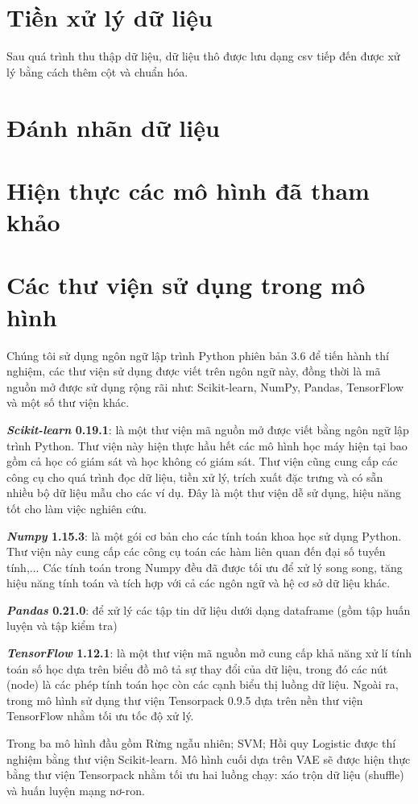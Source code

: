 \section{Tiền xử lý dữ liệu}
Sau quá trình thu thập dữ liệu, dữ liệu thô được lưu dạng csv tiếp đến được xử lý bằng cách thêm cột và chuẩn hóa.

\section{Đánh nhãn dữ liệu}

\section{Hiện thực các mô hình đã tham khảo}

\section{Các thư viện sử dụng trong mô hình}
Chúng tôi sử dụng ngôn ngữ lập trình Python phiên bản 3.6 để tiến hành thí nghiệm, các thư viện sử dụng được viết trên ngôn ngữ này, đồng thời là mã nguồn mở được sử dụng rộng rãi như: Scikit-learn, NumPy, Pandas, TensorFlow và một số thư viện khác.

\textbf{\textit{Scikit-learn} 0.19.1}: là một thư viện mã nguồn mở được viết bằng ngôn ngữ lập trình Python. Thư viện này hiện thực hầu hết các mô hình học máy hiện tại bao gồm cả học có giám sát và học
không có giám sát. Thư viện cũng cung cấp các công cụ cho quá trình đọc dữ liệu, tiền xử lý,
trích xuất đặc trưng và có sẵn nhiều bộ dữ liệu mẫu cho các ví dụ. Đây là một thư viện dễ sử
dụng, hiệu năng tốt cho làm việc nghiên cứu.

\textbf{\textit{Numpy} 1.15.3}: là một gói cơ bản cho các tính toán khoa học sử dụng Python. Thư viện này cung cấp các công cụ toán các hàm liên quan đến đại số tuyến tính,... Các tính
toán trong Numpy đều đã được tối ưu để xử lý song song, tăng hiệu năng tính toán và tích hợp
với cả các ngôn ngữ và hệ cơ sở dữ liệu khác.

\textbf{\textit{Pandas} 0.21.0}: để xử lý các
tập tin dữ liệu dưới dạng dataframe (gồm tập huấn luyện và tập kiểm tra)

\textbf{\textit{TensorFlow} 1.12.1}: là một thư viện mã nguồn mở cung cấp khả năng xử lí tính toán số học dựa trên biểu đồ mô tả sự thay đổi của dữ liệu, trong đó các nút (node) là các phép tính toán học còn các cạnh biểu thị luồng dữ liệu. Ngoài ra, trong mô hình sử dụng thư viện Tensorpack 0.9.5 dựa trên nền thư viện TensorFlow nhằm tối ưu tốc độ xử lý.

Trong ba mô hình đầu gồm Rừng ngẫu nhiên; SVM; Hồi quy Logistic được thí nghiệm bằng thư viện Scikit-learn. Mô hình cuối dựa trên VAE sẽ được hiện thực bằng thư viện Tensorpack nhằm tối ưu hai luồng chạy: xáo trộn dữ liệu (shuffle) và huấn luyện mạng nơ-ron.
